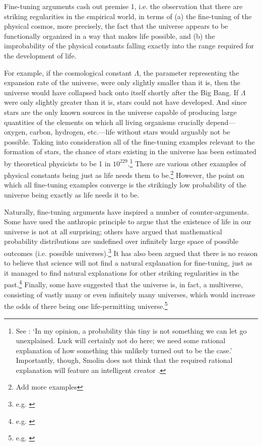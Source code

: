 \documentclass[a4paper,12pt]{article}
\begin{document}
Fine-tuning arguments cash out premise 1, i.e. the observation that there are striking regularities in the empirical world, in terms of (a) the fine-tuning of the physical cosmos, more precisely, the fact that the universe appears to be functionally organized in a way that makes life possible, and (b) the improbability of the physical constants falling exactly into the range required for the development of life.

For example, if the cosmological constant $\Lambda$, the parameter representing the expansion rate of the universe, were only slightly smaller than it is, then the universe would have collapsed back onto itself shortly after the Big Bang. If $\Lambda$ were only slightly greater than it is, stars could not have developed. And since stars are the only known sources in the universe capable of producing large quantities of the elements on which all living organisms crucially depend---oxygen, carbon, hydrogen, etc.---life without stars would arguably not be possible. Taking into consideration all of the fine-tuning examples relevant to the formation of stars, the chance of stars existing in the universe has been estimated by theoretical physicists to be 1 in $10^{229}$.\footnote{See \citealp[p.~45]{Smolin1999}: `In my opinion, a probability this tiny is not something we can let go unexplained. Luck will certainly not do here; we need some rational explanation of how something this unlikely turned out to be the case.' Importantly, though, Smolin does not think that the required rational explanation will feature an intelligent creator \cite[p.~282]{Huberman2006}.} There are various other examples of physical constants being just as life needs them to be.\footnote{Add more examples} However, the point on which all fine-tuning examples converge is the strikingly low probability of the universe being exactly as life needs it to be.

Naturally, fine-tuning arguments have inspired a number of counter-arguments. Some have used the anthropic principle to argue that the existence of life in our universe is not at all surprising; others have argued that mathematical probability distributions are undefined over infinitely large space of possible outcomes (i.e. possible universes).\footnote{e.g. \cite{McGrew_etal2001}} It has also been argued that there is no reason to believe that science will not find a natural explanation for fine-tuning, just as it managed to find natural explanations for other striking regularities in the past.\footnote{e.g. \cite{Harnik_etal2006}} Finally, some have suggested that the universe is, in fact, a multiverse, consisting of vastly many or even infinitely many universes, which would increase the odds of there being one life-permitting universe.\footnote{e.g. \cite{Kraay2014}}
\end{document}
